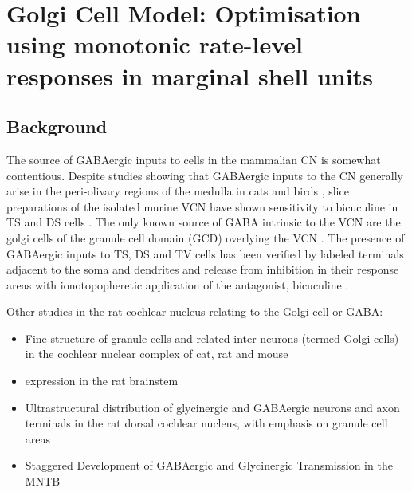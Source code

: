 
\graphicspath{{../figures/}{./gfx/}{/media/data/Work/cnstellate/golgi/}{/media/data/Work/Responses/}{/media/data/Work/cnstellate/Responses/}}

\section[Golgi Cell Model]{Golgi Cell Model: Optimisation using
  monotonic rate-level responses in marginal shell units}
\label{sec:GolgiCellModel}

\subsection{Background}

The source of GABAergic inputs to cells in the mammalian CN is
somewhat contentious. Despite studies showing that GABAergic inputs to
the CN generally arise in the peri-olivary regions of the medulla in
cats \citep{OstapoffBensonEtAl:1997} and birds
\citep{LachicaRubsamenEtAl:1995,YangMonsivaisEtAl:1999}, slice
preparations of the isolated murine VCN have shown sensitivity to
bicuculine in TS and DS cells \citep{FerragamoGoldingEtAl:1998a}.  The
only known source of GABA intrinsic to the VCN are the golgi cells of
the granule cell domain (GCD) overlying the VCN
\citep[Fig.~\ref{fig:CNdiagram}]{Mugnaini:1985,FerragamoGoldingEtAl:1998}.
The presence of GABAergic inputs to TS, DS and TV cells has been
verified by labeled terminals adjacent to the soma and dendrites
\citep{SmithRhode:1989,AwatramaniTurecekEtAl:2005,BabalianRyugoEtAl:2003}
and release from inhibition in their response areas with
ionotopopheretic application of the \GABAa antagonist, bicuculine
\citep{EvansZhao:1998,CasparyBackoffEtAl:1994,BackoffShadduckEtAl:1999,FerragamoGoldingEtAl:1998a}.

\medskip{}

Other studies in the rat cochlear nucleus relating to the Golgi cell or GABA:
\begin{itemize}
\item \citep{MugnainiOsenEtAl:1980} Fine structure of granule cells
  and related inter-neurons (termed {Golgi} cells) in the cochlear
  nuclear complex of cat, rat and mouse
\item \GABAa expression in the rat brainstem  \citep{CamposCaboEtAl:2001}
\item \citep{Alibardi:2003a} Ultrastructural distribution of
  glycinergic and {{GABAergic}} neurons and axon terminals in the rat
  dorsal cochlear nucleus, with emphasis on granule cell areas
\item \citep{AwatramaniTurecekEtAl:2005} Staggered {Development} of
  {GABAergic} and {Glycinergic} {Transmission} in the {MNTB}
\end{itemize}

